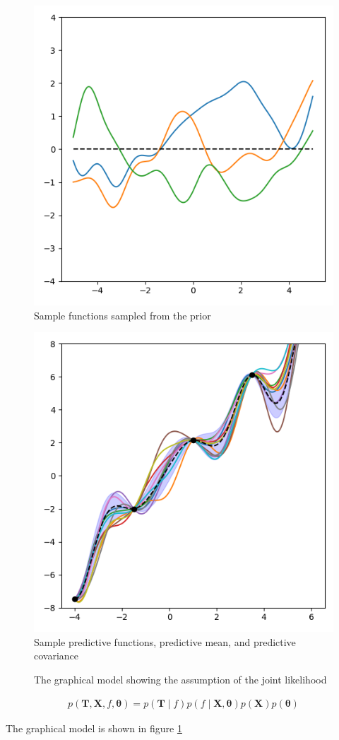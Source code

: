 \documentclass[12pt]{article}
\newenvironment{question}[2][Question]{\begin{trivlist}
\kern10pt
\item[\hskip \labelsep {\bfseries #1}\hskip \labelsep {\bfseries #2.}]}{\end{trivlist}}
\begin{document}
\begin{question}{6}
\begin{figure}[h!]
  \centering
  \includegraphics[width=0.5\linewidth]{fig/Q6-prior.png}
  \caption{Sample functions sampled from the prior}
\end{figure}
\begin{figure}[h!]
  \centering
  \includegraphics[width=0.5\linewidth]{fig/Q6-post-l110.png}
  \caption{Sample predictive functions, predictive mean, and predictive covariance}
\end{figure}
\end{question}

\begin{question}{7}
  \begin{figure}[h!]
    \centering
  \caption{The graphical model showing the assumption of the joint likelihood}
  \label{fig:Q7-graphs}
  \end{figure}
  \begin{align*}
    p(\mathbf{T}, \mathbf{X}, f, \bm{\theta}) 
      = p(\mathbf{T}\mid f)p(f \mid \mathbf{X},\bm{\theta})
      p(\mathbf{X})p(\bm{\theta}) 
  \end{align*}

The graphical model is shown in figure \ref{fig:Q7-graphs}
\end{question}
\end{document}
